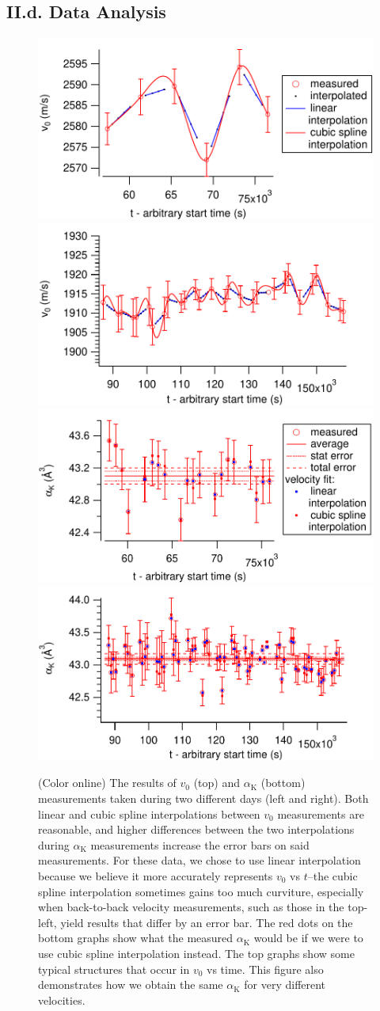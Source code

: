 \documentclass[twocolumn,prl,showpacs,superscriptaddress]{revtex4-1}   %
\newcommand{\ak}{\alpha_{\textrm{K}}}
\begin{document}
\subsection{II.d. Data Analysis}

\begin{figure}
\includegraphics[width=0.49\linewidth,keepaspectratio]{velVsTime_150212.pdf}
\includegraphics[width=0.49\linewidth,keepaspectratio]{velVsTime_150413.pdf}
\includegraphics[width=0.49\linewidth,keepaspectratio]{polVsTime_150212.pdf}
\includegraphics[width=0.49\linewidth,keepaspectratio]{polVsTime_150413.pdf}
\caption{\label{velPolVsTimeExample}(Color online) The results of $v_0$ (top) and $\ak$ (bottom) measurements taken during two different days (left and right). Both linear and cubic spline interpolations between $v_0$ measurements are reasonable, and higher differences between the two interpolations during $\ak$ measurements increase the error bars on said measurements. For these data, we chose to use linear interpolation because we believe it more accurately represents $v_0$ vs $t$--the cubic spline interpolation sometimes gains too much curviture, especially when back-to-back velocity measurements, such as those in the top-left, yield results that differ by an error bar. The red dots on the bottom graphs show what the measured $\ak$ would be if we were to use cubic spline interpolation instead. The top graphs show some typical structures that occur in $v_0$ vs time. This figure also demonstrates how we obtain the same $\ak$ for very different velocities.}
\end{figure}
\end{document}

